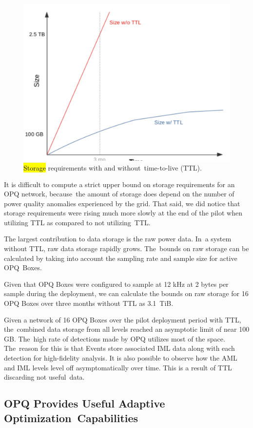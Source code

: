 \documentclass[energies,article,accept,moreauthors,pdftex]{Definitions/mdpi}
\begin{document}
\begin{figure}[H]
\centering
\includegraphics[width=0.4\linewidth]{images/pilot/data-management-graph.png}
\caption{\hl{Storage} requirements with and without~time-to-live (TTL).} %
\label{fig:data-management-graph}
\end{figure}

It is difficult to compute a strict upper bound on storage requirements for an OPQ network, because~the amount of storage does depend on the number of power quality anomalies experienced by the grid. That said, we did notice that storage requirements were rising much more slowly at the end of the pilot when utilizing TTL as compared to not utilizing~TTL.

The largest contribution to data storage is the raw power data. In~a system without TTL, raw data storage rapidly grows. The~bounds on raw storage can be calculated by taking into account the sampling rate and sample size for active OPQ~Boxes.

Given that OPQ Boxes were configured to sample at 12 kHz at 2 bytes per sample during the deployment, we can calculate the bounds on raw storage for 16 OPQ Boxes over three months without TTL as 3.1~TiB.

Given a network of 16 OPQ Boxes over the pilot deployment period with TTL, the~combined data storage from all levels reached an asymptotic limit of near 100 GB. The~high rate of detections made by OPQ utilizes most of the space. The~reason for this is that Events store associated IML data along with each detection for high-fidelity analysis. It is also possible to observe how the AML and IML levels level off asymptomatically over time. This is a result of TTL discarding not useful~data.

\subsection{OPQ Provides Useful Adaptive Optimization~Capabilities}
\label{sec:adaptive-optimization}
\end{document}
